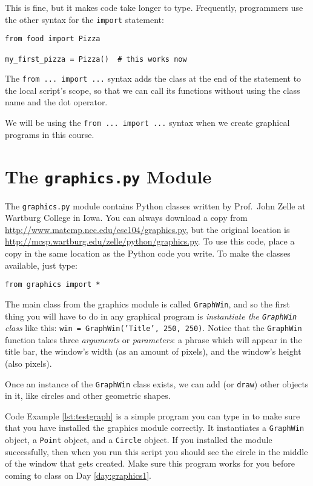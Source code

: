 This is fine, but it makes code take longer to type.  Frequently, programmers use the other syntax for the \texttt{import} statement:

\begin{verbatim}
from food import Pizza

my_first_pizza = Pizza()  # this works now
\end{verbatim}

The \texttt{from ... import ...} syntax adds the class at the end of the statement to the local script's scope, so that we can call its functions without using the class name and the dot operator.

We will be using the \texttt{from ... import ...} syntax when we create graphical programs in this course.

\section{The \texttt{graphics.py} Module}

The \texttt{graphics.py} module contains Python classes written by Prof.\ John Zelle at Wartburg College in Iowa.  You can always download a copy from \url{http://www.matcmp.ncc.edu/csc104/graphics.py}, but the original location is \url{http://mcsp.wartburg.edu/zelle/python/graphics.py}.  To use this code, place a copy in the same location as the Python code you write.  To make the classes available, just type:

\begin{verbatim}
from graphics import *
\end{verbatim}

The main class from the graphics module is called \texttt{GraphWin}, and so the first thing you will have to do in any graphical program is \textit{instantiate the \texttt{GraphWin} class} like this:  \texttt{win = GraphWin('Title', 250, 250)}.  Notice that the \texttt{GraphWin} function takes three \textit{arguments} or \textit{parameters}: a phrase which will appear in the title bar, the window's width (as an amount of pixels), and the window's height (also pixels).

Once an instance of the \texttt{GraphWin} class exists, we can add (or \texttt{draw}) other objects in it, like circles and other geometric shapes.

Code Example \ref{lst:testgraph} is a simple program you can type in to make sure that you have installed the graphics module correctly.  It instantiates a \texttt{GraphWin} object, a \texttt{Point} object, and a \texttt{Circle} object.  If you installed the module successfully, then when you run this script you should see the circle in the middle of the window that gets created.  Make sure this program works for you before coming to class on Day \ref{day:graphics1}.

